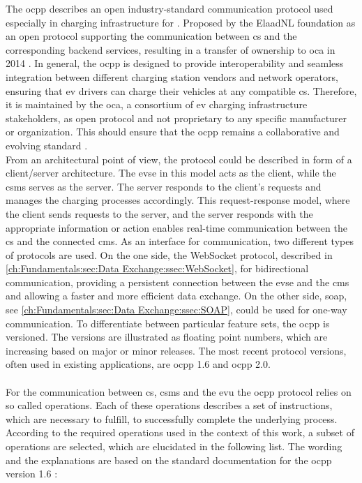 The \acrfull{ocpp} describes an open industry-standard communication protocol used especially in charging infrastructure for . Proposed by the ElaadNL foundation as an open protocol supporting the communication between \acrshort{cs} and the corresponding backend services, resulting in a transfer of ownership to \acrshort{oca} in 2014 \cite{garofalaki_electric_2022}.
In general, the \acrshort{ocpp} is designed to provide interoperability and seamless integration between different charging station vendors and network operators, ensuring that \acrshort{ev} drivers can charge their vehicles at any compatible \acrshort{cs}. 
Therefore, it is maintained by the \acrfull{oca}, a consortium of \acrshort{ev} charging infrastructure stakeholders, as open protocol and not proprietary to any specific manufacturer or organization. 
This should ensure that the \acrshort{ocpp} remains a collaborative and evolving standard \cite{noauthor_ocpp_nodate-1}. \\
From an architectural point of view, the protocol could be described in form of a client/server architecture. The \acrshort{evse} in this model acts as the client, while the \acrshort{csms} serves as the server. 
The server responds to the client's requests and manages the charging processes accordingly. This request-response model, where the client sends requests to the server, and the server responds with the appropriate information or action enables real-time communication between the \acrfull{cs} and the connected \acrfull{cms}.
As an interface for communication, two different types of protocols are used. On the one side, the WebSocket protocol, described in \ref{ch:Fundamentals:sec:Data Exchange:ssec:WebSocket}, for bidirectional communication, providing a persistent connection between the \acrshort{evse} and the \acrshort{cms} and allowing a faster and more efficient data exchange. On the other side, \acrfull{soap}, see \ref{ch:Fundamentals:sec:Data Exchange:ssec:SOAP}, could be used for one-way communication.
To differentiate between particular feature sets, the \acrshort{ocpp} is versioned. 
The versions are illustrated as floating point numbers, which are increasing based on major or minor releases. 
The most recent protocol versions, often used in existing applications, are \acrshort{ocpp} 1.6 and \acrshort{ocpp} 2.0. \\ \\
\noindent For the communication between \acrshort{cs}, \acrshort{csms} and the \acrshort{evu} the \acrshort{ocpp} protocol relies on so called operations. Each of these operations describes a set of instructions, which are necessary to fulfill, to successfully complete the underlying process.
According to the required operations used in the context of this work, a subset of operations are selected, which are elucidated in the following list. 
The wording and the explanations are based on the standard documentation for the \acrshort{ocpp} version 1.6 \cite{noauthor_ocpp_nodate-1}:

